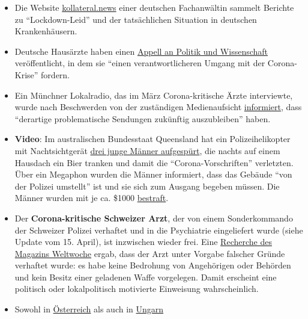 \begin{itemize}
\tightlist
\item
  Die Website \href{https://kollateral.news/}{kollateral.news} einer
  deutschen Fachanwältin sammelt Berichte zu ``Lockdown-Leid'' und der
  tatsächlichen Situation in deutschen Krankenhäusern.
\item
  Deutsche Hausärzte haben einen
  \href{https://aerzteinnenvorort.de/der-appell}{Appell an Politik und
  Wissenschaft} veröffentlicht, in dem sie ``einen verantwortlicheren
  Umgang mit der Corona-Krise'' fordern.
\item
  Ein Münchner Lokalradio, das im März Corona-kritische Ärzte
  interviewte, wurde nach Beschwerden von der zuständigen Medienaufsicht
  \href{https://norberthaering.de/medienversagen/radiomuenchen-blm-meinungsvielfalt/}{informiert},
  dass ``derartige problematische Sendungen zukünftig auszubleiben''
  haben.
\item
  \textbf{Video}: Im australischen Bundesstaat Queensland hat ein
  Polizeihelikopter mit Nachtsichtgerät
  \href{https://twitter.com/Independent/status/1252911273597120513}{drei
  junge Männer aufgespürt}, die nachts auf einem Hausdach ein Bier
  tranken und damit die ``Corona-Vorschriften'' verletzten. Über ein
  Megaphon wurden die Männer informiert, dass das Gebäude ``von der
  Polizei umstellt'' ist und sie sich zum Ausgang begeben müssen. Die
  Männer wurden mit je ca. \$1000
  \href{https://www.dailystar.co.uk/news/world-news/police-helicopter-uses-night-vision-21899640}{bestraft}.
\item
  Der \textbf{Corona-kritische Schweizer Arzt}, der von einem
  Sonderkommando der Schweizer Polizei verhaftet und in die Psychiatrie
  eingeliefert wurde (siehe Update vom 15. April), ist inzwischen wieder
  frei. Eine
  \href{https://uncut-news.ch/wp-content/uploads/2020/04/Wer-l\%C3\%B6ste-den-Fehlalarm-aus.pdf}{Recherche
  des Magazins Weltwoche} ergab, dass der Arzt unter Vorgabe falscher
  Gründe verhaftet wurde: es habe keine Bedrohung von Angehörigen oder
  Behörden und kein Besitz einer geladenen Waffe vorgelegen. Damit
  erscheint eine politisch oder lokalpolitisch motivierte Einweisung
  wahrscheinlich.
\item
  Sowohl in
  \href{https://www.sn.at/panorama/oesterreich/arzt-droht-berufsverbot-wegen-kritik-an-corona-massnahmen-86594140}{Österreich}
  als auch in
  \href{https://magyarhang.org/belfold/2020/04/16/etikai-vizsgalat-indul-az-orvos-ellen-aki-szerint-nincs-jarvany-es-az-idosek-csak-a-felelemtol-halnak-meg/}{Ungarn}

\end{itemize}
